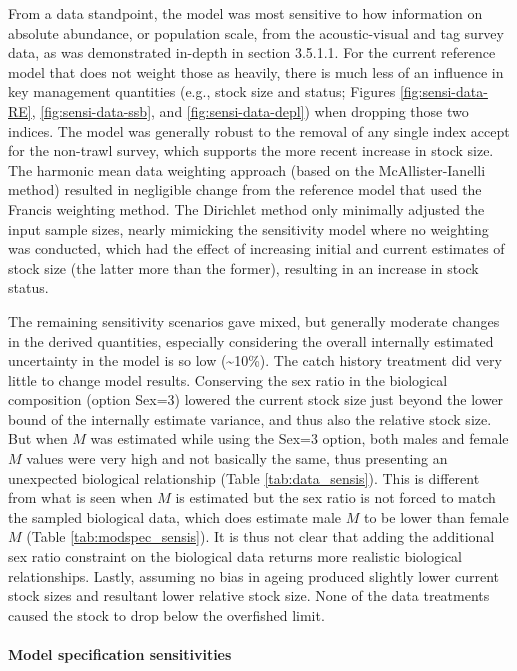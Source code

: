 \documentclass[11pt,
  english,
  letterpaper,
]{article}
\begin{document}
From a data standpoint, the model was most sensitive to how information on absolute abundance, or population scale, from the acoustic-visual and tag survey data, as was demonstrated in-depth in section 3.5.1.1. For the current reference model that does not weight those as heavily, there is much less of an influence in key management quantities (e.g., stock size and status; Figures \ref{fig:sensi-data-RE}, \ref{fig:sensi-data-ssb}, and \ref{fig:sensi-data-depl}) when dropping those two indices. The model was generally robust to the removal of any single index accept for the non-trawl survey, which supports the more recent increase in stock size. The harmonic mean data weighting approach (based on the McAllister-Ianelli method) resulted in negligible change from the reference model that used the Francis weighting method. The Dirichlet method only minimally adjusted the input sample sizes, nearly mimicking the sensitivity model where no weighting was conducted, which had the effect of increasing initial and current estimates of stock size (the latter more than the former), resulting in an increase in stock status.

The remaining sensitivity scenarios gave mixed, but generally moderate changes in the derived quantities, especially considering the overall internally estimated uncertainty in the model is so low (\textasciitilde10\%). The catch history treatment did very little to change model results. Conserving the sex ratio in the biological composition (option Sex=3) lowered the current stock size just beyond the lower bound of the internally estimate variance, and thus also the relative stock size. But when \(M\) was estimated while using the Sex=3 option, both males and female \(M\) values were very high and not basically the same, thus presenting an unexpected biological relationship (Table \ref{tab:data_sensis}). This is different from what is seen when \(M\) is estimated but the sex ratio is not forced to match the sampled biological data, which does estimate male \(M\) to be lower than female \(M\) (Table \ref{tab:modspec_sensis}). It is thus not clear that adding the additional sex ratio constraint on the biological data returns more realistic biological relationships. Lastly, assuming no bias in ageing produced slightly lower current stock sizes and resultant lower relative stock size. None of the data treatments caused the stock to drop below the overfished limit.

\hypertarget{model-specification-sensitivities-1}{%
\paragraph{Model specification sensitivities}\label{model-specification-sensitivities-1}}
\end{document}
